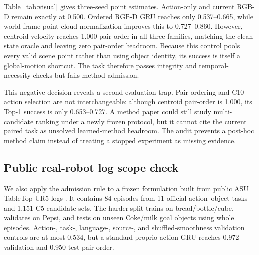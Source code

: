 \documentclass[letterpaper,10pt,conference]{ieeeconf}
\begin{document}
Table~\ref{tab:visual} gives three-seed point estimates. Action-only and
current RGB-D remain exactly at 0.500. Ordered RGB-D GRU reaches only
0.537--0.665, while world-frame point-cloud normalization improves this to
0.727--0.860. However, centroid velocity reaches 1.000 pair-order in all three
families, matching the clean-state oracle and leaving zero pair-order headroom.
Because this control pools every valid scene point rather than using object
identity, its success is itself a global-motion shortcut. The task therefore
passes integrity and temporal-necessity checks but fails method admission.

\begin{table}[t]
    \centering
    \caption{Visual stress test under held-camera + corruption (the frozen
    \texttt{combined\_held\_dropout} key, all non-complete test histories).
    Columns except ``Cent. Top-1'' are pair-order accuracy. The frozen visual
    confidence intervals are intentionally suppressed because their score-
    ensemble bootstrap estimand does not match the displayed seed-average
    point estimate.}
    \label{tab:visual}
    \resizebox{0.87\textwidth}{!}{}
\end{table}

This negative decision reveals a second evaluation trap. Pair ordering and
C10 action selection are not interchangeable: although centroid pair-order is
1.000, its Top-1 success is only 0.653--0.727. A method paper could still study
multi-candidate ranking under a newly frozen protocol, but it cannot cite the
current paired task as unsolved learned-method headroom. The audit prevents a
post-hoc method claim instead of treating a stopped experiment as missing
evidence.

\subsection{Public real-robot log scope check}

We also apply the admission rule to a frozen formulation built from public ASU
TableTop UR5 logs \cite{zhou2023modularity}. It contains 84 episodes from 11
official action--object tasks and 1,151 C5 candidate sets. The harder split
trains on bread/bottle/cube, validates on Pepsi, and tests on unseen Coke/milk
goal objects using whole episodes. Action-, task-, language-, source-, and
shuffled-smoothness validation controls are at most 0.534, but a standard
proprio-action GRU reaches 0.972 validation and 0.950 test pair-order.
\end{document}
